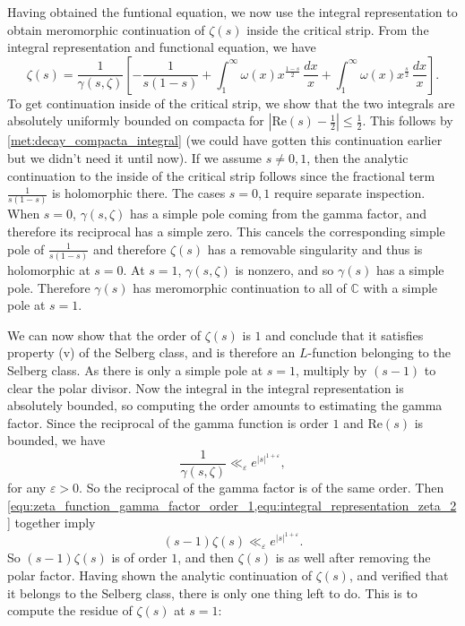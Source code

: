 \documentclass[12pt]{book}
\theoremstyle{definition}\newframedtheorem{method}{Method}
\newcommand{\C}{\mathbb{C}}
\newcommand{\g}{\gamma}
\newcommand{\z}{\zeta}
\newcommand{\w}{\omega}
\newcommand{\e}{\varepsilon}
\newcommand{\<}{\langle}
\renewcommand{\>}{\rangle}
\renewcommand{\Re}{\mathrm{Re}}
\begin{document}
      Having obtained the funtional equation, we now use the integral representation to obtain meromorphic continuation of $\z(s)$ inside the critical strip. From the integral representation and functional equation, we have
      \begin{equation}\label{equ:integral_representation_zeta_2}
        \z(s) = \frac{1}{\g(s,\z)}\left[-\frac{1}{s(1-s)}+\int_{1}^{\infty}\w(x)x^{\frac{1-s}{2}}\,\frac{dx}{x}+\int_{1}^{\infty}\w(x)x^{\frac{s}{2}}\,\frac{dx}{x}\right].
      \end{equation}
      To get continuation inside of the critical strip, we show that the two integrals are absolutely uniformly bounded on compacta for $|\Re(s)-\frac{1}{2}| \le \frac{1}{2}$. This follows by \cref{met:decay_compacta_integral} (we could have gotten this continuation earlier but we didn't need it until now). If we assume $s \neq 0,1$, then the analytic continuation to the inside of the critical strip follows since the fractional term $\frac{1}{s(1-s)}$ is holomorphic there. The cases $s = 0,1$ require separate inspection. When $s = 0$, $\g(s,\z)$ has a simple pole coming from the gamma factor, and therefore its reciprocal has a simple zero. This cancels the corresponding simple pole of $\frac{1}{s(1-s)}$ and therefore $\z(s)$ has a removable singularity and thus is holomorphic at $s = 0$. At $s = 1$, $\g(s,\z)$ is nonzero, and so $\g(s)$ has a simple pole. Therefore $\g(s)$ has meromorphic continuation to all of $\C$ with a simple pole at $s = 1$.

      We can now show that the order of $\z(s)$ is $1$ and conclude that it satisfies property (v) of the Selberg class, and is therefore an $L$-function belonging to the Selberg class. As there is only a simple pole at $s = 1$, multiply by $(s-1)$ to clear the polar divisor. Now the integral in the integral representation is absolutely bounded, so computing the order amounts to estimating the gamma factor. Since the reciprocal of the gamma function is order $1$ and $\Re(s)$ is bounded, we have
      \begin{equation}\label{equ:zeta_function_gamma_factor_order_1}
        \frac{1}{\g(s,\z)} \ll_{\e} e^{|s|^{1+\e}},
      \end{equation}
      for any $\e > 0$. So the reciprocal of the gamma factor is of the same order. Then \cref{equ:zeta_function_gamma_factor_order_1,equ:integral_representation_zeta_2} together imply
      \[
        (s-1)\z(s) \ll_{\e} e^{|s|^{1+\e}}.
      \]
      So $(s-1)\z(s)$ is of order $1$, and then $\z(s)$ is as well after removing the polar factor. Having shown the analytic continuation of $\z(s)$, and verified that it belongs to the Selberg class, there is only one thing left to do. This is to compute the residue of $\z(s)$ at $s = 1$:
\end{document}

